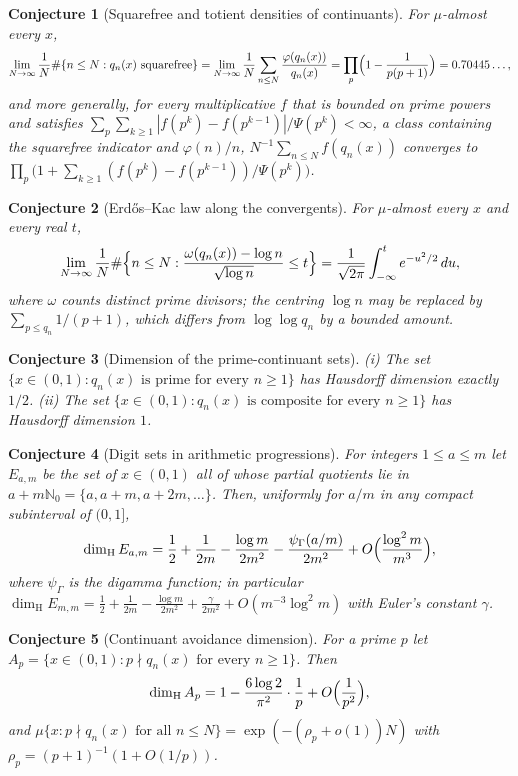 \documentclass[11pt]{article}
\newtheorem{conjecture}{Conjecture}
\theoremstyle{definition}
\begin{document}
\begin{conjecture}[Squarefree and totient densities of continuants]\label{at3}
For $\mu$-almost every $x$,
\[
 \lim_{N\to\infty}\frac1N\#\{n\le N:q_n(x)\text{ squarefree}\}
 =\lim_{N\to\infty}\frac1N\sum_{n\le N}\frac{\varphi(q_n(x))}{q_n(x)}
 =\prod_p\Bigl(1-\frac1{p(p+1)}\Bigr)=0.70445\ldots,
\]
and more generally, for every multiplicative $f$ that is bounded on
prime powers and satisfies
$\sum_p\sum_{k\ge1}|f(p^k)-f(p^{k-1})|/\Psi(p^k)<\infty$, a class
containing the squarefree indicator and $\varphi(n)/n$,
$N^{-1}\sum_{n\le N}f(q_n(x))$ converges to
$\prod_p\bigl(1+\sum_{k\ge1}(f(p^k)-f(p^{k-1}))/\Psi(p^k)\bigr)$.
\end{conjecture}


\begin{conjecture}[Erd\H os--Kac law along the convergents]\label{at4}
For $\mu$-almost every $x$ and every real $t$,
\[
 \lim_{N\to\infty}\frac1N\#\Bigl\{n\le N:
 \frac{\omega(q_n(x))-\log n}{\sqrt{\log n}}\le t\Bigr\}
 =\frac1{\sqrt{2\pi}}\int_{-\infty}^t e^{-u^2/2}\,du,
\]
where $\omega$ counts distinct prime divisors; the centring $\log n$ may be
replaced by $\sum_{p\le q_n}1/(p+1)$, which differs from
$\log\log q_n$ by a bounded amount.
\end{conjecture}


\begin{conjecture}[Dimension of the prime-continuant sets]\label{at5}
{\rm(i)} The set $\{x\in(0,1):q_n(x)\text{ is prime for every }n\ge1\}$ has
Hausdorff dimension exactly $1/2$.
{\rm(ii)} The set $\{x\in(0,1):q_n(x)\text{ is composite for every }n\ge1\}$
has Hausdorff dimension $1$.
\end{conjecture}


\begin{conjecture}[Digit sets in arithmetic progressions]\label{at6}
For integers $1\le a\le m$ let $E_{a,m}$ be the set of $x\in(0,1)$ all of
whose partial quotients lie in $a+m\mathbb N_0=\{a,a+m,a+2m,\dots\}$.  Then,
uniformly for $a/m$ in any compact subinterval of $(0,1]$,
\[
 \dim_{\mathrm H}E_{a,m}
 =\frac12+\frac1{2m}-\frac{\log m}{2m^2}-\frac{\psi_\Gamma(a/m)}{2m^2}
 +O\Bigl(\frac{\log^2m}{m^3}\Bigr),
\]
where $\psi_\Gamma$ is the digamma function; in particular
$\dim_{\mathrm H}E_{m,m}=\tfrac12+\tfrac1{2m}-\tfrac{\log m}{2m^2}+\tfrac{\gamma}{2m^2}+O(m^{-3}\log^2m)$
with Euler's constant $\gamma$.
\end{conjecture}


\begin{conjecture}[Continuant avoidance dimension]\label{at7}
For a prime $p$ let $A_p=\{x\in(0,1):p\nmid q_n(x)\text{ for every }n\ge1\}$.
Then
\[
 \dim_{\mathrm H}A_p=1-\frac{6\log2}{\pi^2}\cdot\frac1p+O\Bigl(\frac1{p^2}\Bigr),
\]
and $\mu\{x:p\nmid q_n(x)\text{ for all }n\le N\}=\exp(-(\rho_p+o(1))N)$
with $\rho_p=(p+1)^{-1}(1+O(1/p))$.
\end{conjecture}
\end{document}
